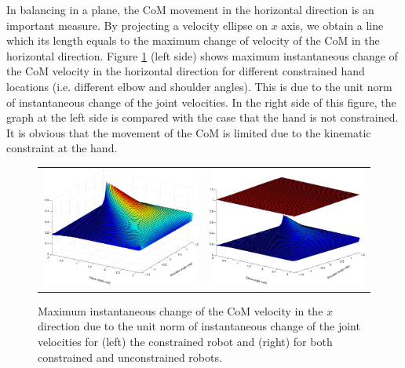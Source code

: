 In balancing in a plane, the CoM movement in the horizontal direction is an
important measure. By projecting a velocity ellipse on $x$ axis, we obtain a
line which its length equals to the maximum change of velocity of the CoM in
the horizontal direction. Figure \ref{type2} (left side) shows maximum
instantaneous change of the CoM velocity in the horizontal direction for
different constrained hand locations (i.e. different elbow and shoulder
angles). This is due to the unit norm of instantaneous change of the joint
velocities. In the right side of this figure, the graph at the left side is
compared with the case that the hand is not constrained. It is obvious that
the movement of the CoM is limited due to the kinematic constraint at the
hand.
\begin{figure}[!t]
  \centering
  \begin{tabular}{lr}
    \includegraphics[width=0.5\linewidth]{images/type2_2.pdf}
    &  
    \includegraphics[width=0.5\linewidth]{images/type2.pdf}
  \end{tabular}
  \caption{Maximum instantaneous change of the CoM velocity in the $x$
    direction due to the unit norm of instantaneous change of the joint
    velocities for (left) the constrained robot and (right) for both
    constrained and unconstrained robots.}
  \label{type2}
\end{figure}

